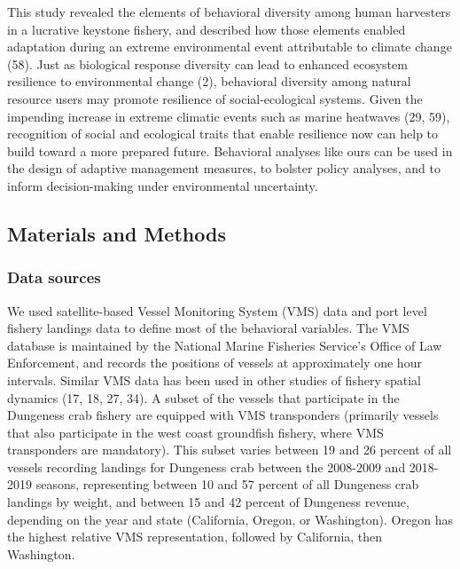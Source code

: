 \documentclass[9pt,twocolumn,twoside,lineno]{pnas-new}
\begin{document}
This study revealed the elements of behavioral diversity among human
harvesters in a lucrative keystone fishery, and described how those
elements enabled adaptation during an extreme environmental event
attributable to climate change (58). Just as biological response
diversity can lead to enhanced ecosystem resilience to environmental
change (2), behavioral diversity among natural resource users may
promote resilience of social-ecological systems. Given the impending
increase in extreme climatic events such as marine heatwaves (29, 59),
recognition of social and ecological traits that enable resilience now
can help to build toward a more prepared future. Behavioral analyses
like ours can be used in the design of adaptive management measures, to
bolster policy analyses, and to inform decision-making under
environmental uncertainty.

\hypertarget{methods}{%
\subsection*{Materials and Methods}\label{methods}}

\hypertarget{data-sources}{%
\subsubsection*{Data sources}\label{data-sources}}

We used satellite-based Vessel Monitoring System (VMS) data and port
level fishery landings data to define most of the behavioral variables.
The VMS database is maintained by the National Marine Fisheries
Service's Office of Law Enforcement, and records the positions of
vessels at approximately one hour intervals. Similar VMS data has been
used in other studies of fishery spatial dynamics (17, 18, 27, 34). A
subset of the vessels that participate in the Dungeness crab fishery are
equipped with VMS transponders (primarily vessels that also participate
in the west coast groundfish fishery, where VMS transponders are
mandatory). This subset varies between 19 and 26 percent of all vessels
recording landings for Dungeness crab between the 2008-2009 and
2018-2019 seasons, representing between 10 and 57 percent of all
Dungeness crab landings by weight, and between 15 and 42 percent of
Dungeness revenue, depending on the year and state (California, Oregon,
or Washington). Oregon has the highest relative VMS representation,
followed by California, then Washington.
\end{document}
